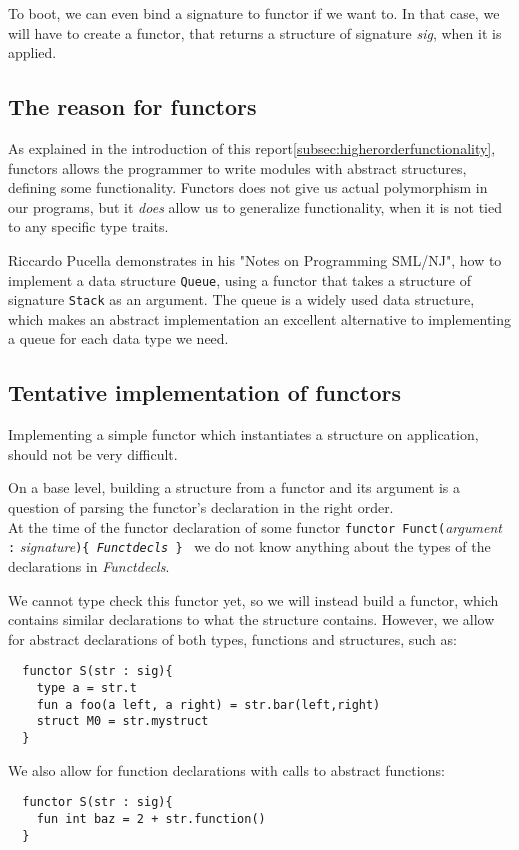 To boot, we can even bind a signature to functor if we want to. In that case, we
will have to create a functor, that returns a structure of signature
\textit{sig}, when it is applied.

\subsection{The reason for functors}
\label{subsec:reasonfunctors}
As explained in the introduction of this report\ref{subsec:higherorderfunctionality},
functors allows the programmer to write modules with abstract structures,
defining some functionality.
Functors does not give us actual polymorphism in our programs, but it
\emph{does} allow us to generalize functionality, when it is not tied to any
specific type traits.

Riccardo Pucella demonstrates in his "Notes on Programming SML/NJ"\cite[pp. 59-60]{functors}, how to implement a data structure \texttt{Queue}, using a functor that takes a structure of signature \texttt{Stack} as an argument. The queue is a widely used data structure, which makes an abstract implementation an excellent alternative to implementing a queue for each data type we need.
\subsection{Tentative implementation of functors}
\label{subsec:implementing_functors}
Implementing a simple functor which instantiates a structure on application,
should not be very difficult.

On a base level, building a structure from a functor and its argument is a
question of parsing the functor's declaration in the right order.\\
At the time of the functor declaration of some functor
\texttt{functor Funct(}\textit{argument} \texttt{:}
\textit{signature}\texttt{)\{ \textit{Functdecls} \}} \, we do not
know anything about the types of the declarations in \textit{Functdecls}.

We cannot type check this functor yet, so we will instead build a functor,
which contains similar declarations to what the structure contains.
However, we allow for abstract declarations of both types, functions and
structures, such as:
\begin{lstlisting}
  functor S(str : sig){
    type a = str.t
    fun a foo(a left, a right) = str.bar(left,right)
    struct M0 = str.mystruct
  }
\end{lstlisting}
We also allow for function declarations with calls to abstract functions:
\begin{lstlisting}
  functor S(str : sig){
    fun int baz = 2 + str.function()
  }
\end{lstlisting}

